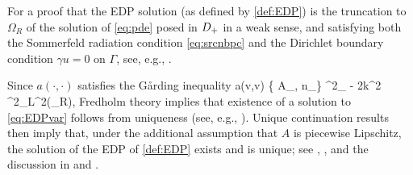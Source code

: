 For a proof that the EDP solution (as defined by \cref{def:EDP}) is the truncation to $\Omega_R$ of the solution of \cref{eq:pde} posed in $D_{+}$ in a weak sense, and satisfying both the Sommerfeld radiation condition \cref{eq:srcnbpc} and the Dirichlet boundary condition $\gamma u =0$ on $\Gamma$, see, e.g., \cite[Lemma 3.3]{GrPeSp:19}.
\ere

Since $a(\cdot,\cdot)$ satisfies the G\aa rding inequality 
\beq\label{eq:Garding}
\Re a(v,v) \geq \min\big\{ A_{\min}, n_{\min}\big\} ^2_{\HokDR} - 2k^2 ^2_{L^2(\Omega_R)},
\eeq
Fredholm theory implies that existence of a solution to \cref{eq:EDPvar} follows from uniqueness (see, e.g., \cite[Theorem 2.34]{Mc:00}).
Unique continuation results then imply that, under the additional assumption that $A$ is piecewise Lipschitz, the solution of the EDP of \cref{def:EDP} exists and is unique; see \cite{GaLi:87}, \cite{BaCaTs:12}, and the discussion in \cite[\S1 and \S2.4]{GrPeSp:19} and \cite[\S]{GrSa:18}.
\ere



